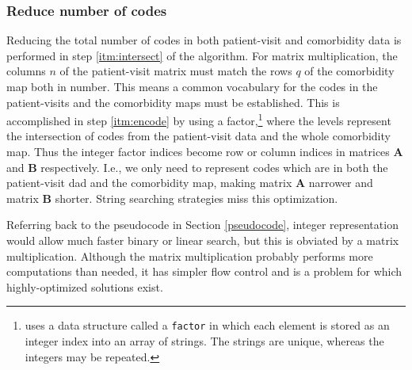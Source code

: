 \documentclass[article]{jss}
\begin{document}
\subsubsection{Reduce number of codes}\label{reduce-number-of-codes}

Reducing the total number of codes in both patient-visit and comorbidity
data is performed in step \ref{itm:intersect} of the algorithm. For
matrix multiplication, the columns \(n\) of the patient-visit matrix
must match the rows \(q\) of the comorbidity map both in number. This
means a common vocabulary for the codes in the patient-visits and the
comorbidity maps must be established. This is accomplished in step
\ref{itm:encode} by using a factor,\footnote{ uses a data
  structure called a \texttt{factor} in which each element is stored as
  an integer index into an array of strings. The strings are unique,
  whereas the integers may be repeated.} where the levels represent the
intersection of codes from the patient-visit data and the whole
comorbidity map. Thus the integer factor indices become row or column
indices in matrices \(\boldsymbol{A}\) and \(\boldsymbol{B}\)
respectively. I.e., we only need to represent codes which are in both
the patient-visit dad and the comorbidity map, making matrix
\(\boldsymbol{A}\) narrower and matrix \(\boldsymbol{B}\) shorter.
String searching strategies miss this optimization.

Referring back to the pseudocode in Section \ref{pseudocode}, integer
representation would allow much faster binary or linear search, but this
is obviated by a matrix multiplication. Although the matrix
multiplication probably performs more computations than needed, it has
simpler flow control and is a problem for which highly-optimized
solutions exist.
\end{document}
